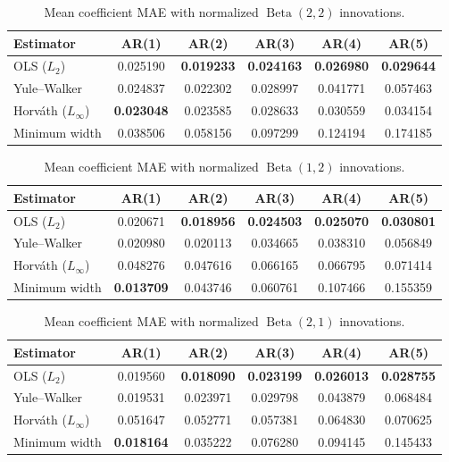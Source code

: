 \documentclass[a4paper,12pt]{scrartcl}
\begin{document}
\begin{table}[H]
\centering
\caption{Mean coefficient MAE with normalized $\operatorname{Beta}(2,2)$ innovations.}
\label{tab:symmetric_peak}
\begin{tabular}{lccccc}
\toprule
Estimator & AR(1) & AR(2) & AR(3) & AR(4) & AR(5) \\
\midrule
OLS ($L_2$)
& 0.025190
& \textbf{0.019233}
& \textbf{0.024163}
& \textbf{0.026980}
& \textbf{0.029644} \\
Yule--Walker
& 0.024837
& 0.022302
& 0.028997
& 0.041771
& 0.057463 \\
Horv\'ath ($L_{\infty}$)
& \textbf{0.023048}
& 0.023585
& 0.028633
& 0.030559
& 0.034154 \\
Minimum width
& 0.038506
& 0.058156
& 0.097299
& 0.124194
& 0.174185 \\
\bottomrule
\end{tabular}
\end{table}
\begin{table}[H]
\centering
\caption{Mean coefficient MAE with normalized $\operatorname{Beta}(1,2)$ innovations.}
\label{tab:right_skew}
\begin{tabular}{lccccc}
\toprule
Estimator & AR(1) & AR(2) & AR(3) & AR(4) & AR(5) \\
\midrule
OLS ($L_2$)
& 0.020671
& \textbf{0.018956}
& \textbf{0.024503}
& \textbf{0.025070}
& \textbf{0.030801} \\
Yule--Walker
& 0.020980
& 0.020113
& 0.034665
& 0.038310
& 0.056849 \\
Horv\'ath ($L_{\infty}$)
& 0.048276
& 0.047616
& 0.066165
& 0.066795
& 0.071414 \\
Minimum width
& \textbf{0.013709}
& 0.043746
& 0.060761
& 0.107466
& 0.155359 \\
\bottomrule
\end{tabular}
\end{table}

\begin{table}[H]
\centering
\caption{Mean coefficient MAE with normalized $\operatorname{Beta}(2,1)$ innovations.}
\label{tab:left_skew}
\begin{tabular}{lccccc}
\toprule
Estimator & AR(1) & AR(2) & AR(3) & AR(4) & AR(5) \\
\midrule
OLS ($L_2$)
& 0.019560
& \textbf{0.018090}
& \textbf{0.023199}
& \textbf{0.026013}
& \textbf{0.028755} \\
Yule--Walker
& 0.019531
& 0.023971
& 0.029798
& 0.043879
& 0.068484 \\
Horv\'ath ($L_{\infty}$)
& 0.051647
& 0.052771
& 0.057381
& 0.064830
& 0.070625 \\
Minimum width
& \textbf{0.018164}
& 0.035222
& 0.076280
& 0.094145
& 0.145433 \\
\bottomrule
\end{tabular}
\end{table}
\end{document}
